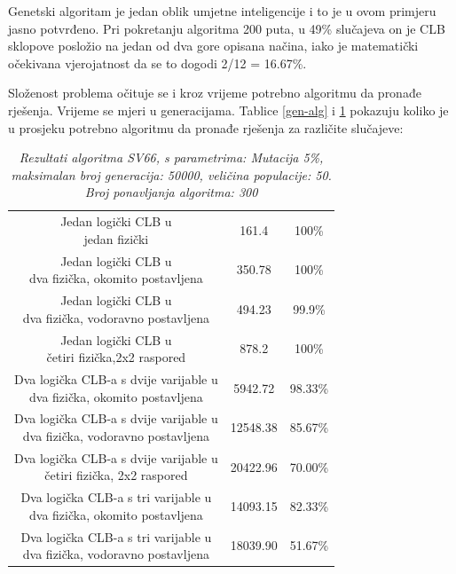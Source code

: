 \documentclass[times, utf8, zavrsni]{fer}
\begin{document}
		
		Genetski algoritam je jedan oblik umjetne inteligencije i to je u ovom primjeru jasno potvrđeno. Pri pokretanju algoritma 200 puta, u 49\% slučajeva on je CLB sklopove posložio na jedan od dva gore opisana načina, iako je matematički očekivana vjerojatnost da se to dogodi 2/12 = 16.67\%. 
				
		Složenost problema očituje se i kroz vrijeme potrebno algoritmu da pronađe rješenja. Vrijeme se mjeri u generacijama. Tablice \ref{gen-alg} i \ref{gen-alg-result} pokazuju koliko je u prosjeku potrebno algoritmu da pronađe rješenja za različite slučajeve:
		
		
		\begin{table}[htb]
			\caption{\emph{Rezultati algoritma SV66, s parametrima: Mutacija 5\%, maksimalan broj generacija: 50000, veličina populacije: 50. Broj ponavljanja algoritma: 300}}
			\label{gen-alg-result}
			\centering
			\begin{tabular}{|c | c | c|} \hline
				\thead{Opis} & \thead{Vrijeme u generacijama} & \thead{Uspješnost} \\ \hline
				\makecell{Jedan logički CLB u \\ jedan fizički } & 161.4 & 100\% \\ \hline
				\makecell{Jedan logički CLB u \\ dva fizička, okomito postavljena} & 350.78 & 100\% \\ \hline
				\makecell{Jedan logički CLB u \\ dva fizička, vodoravno postavljena} & 494.23 & 99.9\% \\ \hline
				\makecell{Jedan logički CLB u \\ četiri fizička,2x2 raspored} & 878.2 & 100\% \\ \hline
				\makecell{Dva logička CLB-a s dvije varijable u \\ dva fizička, okomito postavljena} & 5942.72 & 98.33\% \\ \hline
				\makecell{Dva logička CLB-a s dvije varijable u \\ dva fizička, vodoravno postavljena} & 12548.38 & 85.67\% \\ \hline
				\makecell{Dva logička CLB-a s dvije varijable u \\ četiri fizička, 2x2 raspored} & 20422.96 & 70.00\% \\ \hline
				\makecell{Dva logička CLB-a s tri varijable u \\ dva fizička, okomito postavljena} & 14093.15 & 82.33\% \\ \hline
				\makecell{Dva logička CLB-a s tri varijable u \\ dva fizička, vodoravno postavljena} & 18039.90 & 51.67\% \\ \hline

\end{tabular}
\end{table}
\end{document}
